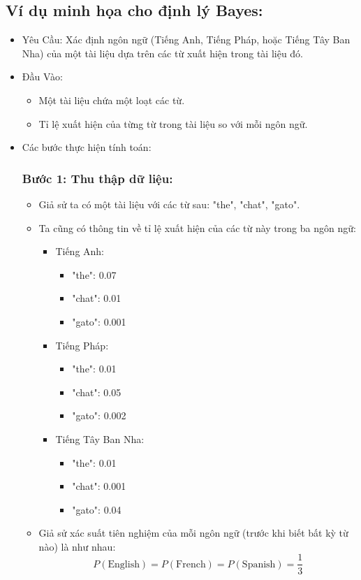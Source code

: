 \subsection{Ví dụ minh họa cho định lý Bayes:}

\begin{itemize}

    \item Yêu Cầu: Xác định ngôn ngữ (Tiếng Anh, Tiếng Pháp, hoặc Tiếng Tây Ban Nha) của một tài liệu dựa trên các từ xuất hiện trong tài liệu đó.
    \item Đầu Vào:
    \begin{itemize}
        \item Một tài liệu chứa một loạt các từ.
        \item Tỉ lệ xuất hiện của từng từ trong tài liệu so với mỗi ngôn ngữ.
    \end{itemize}
    \item Các bước thực hiện tính toán:

        \subsubsection{ Bước 1: Thu thập dữ liệu:}
        \begin{itemize}
            \item Giả sử ta có một tài liệu với các từ sau: "the", "chat", "gato". 
            \item Ta cũng có thông tin về tỉ lệ xuất hiện của các từ này trong ba ngôn ngữ:
            \begin{itemize}
            \item Tiếng Anh:
            \begin{itemize}
                \item "the": 0.07
                \item "chat": 0.01
                \item "gato": 0.001
            \end{itemize}
            \item Tiếng Pháp:
            \begin{itemize}
                \item "the": 0.01
                \item "chat": 0.05
                \item "gato": 0.002
            \end{itemize}
            \item Tiếng Tây Ban Nha:
            \begin{itemize}
                \item "the": 0.01
                \item "chat": 0.001
                \item "gato": 0.04
            \end{itemize}
        \end{itemize}
        \item Giả sử xác suất tiên nghiệm của mỗi ngôn ngữ (trước khi biết bất kỳ từ nào) là như nhau: 
        \[P(\text{English}) = P(\text{French}) = P(\text{Spanish}) = \frac{1}{3}\]
        \end{itemize}

\end{itemize}
